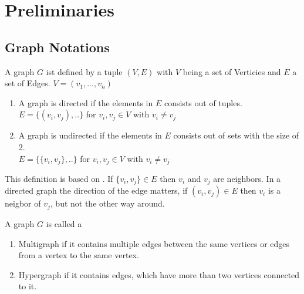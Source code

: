 \chapter{Preliminaries}
\label{Preliminaries}
\section{Graph Notations}
\begin{mydef}
A graph $G$ ist defined by a tuple $(V,E)$ with $V$ being a set of Verticies and $E$ a set of Edges.
$V = (v_{1}, ..., v_{n})$
\begin{enumerate}
 \item A graph is directed if the elements in $E$ consists out of tuples.\\
 $E = \{(v_{i},v_{j}),..\}$ for $v_{i},v_{j} \in V$ with $v_{i} \neq v_{j}$
 \item A graph is undirected if the elements in $E$ consists out of sets with the size of 2.\\
 $E = \{\{v_{i},v_{j}\},..\}$ for $v_{i},v_{j} \in V$ with $v_{i} \neq v_{j}$
\end{enumerate}
\end{mydef}
This definition is based on \cite{Diestel.2012}. If $\{v_{i},v_{j}\} \in E$ then $v_{i}$ and $v_{j}$ are neighbors. In a directed graph the direction of the edge matters, if $(v_{i},v_{j}) \in E$ then $v_{i}$ is a neigbor of $v_{j}$, but not the other way around.
\begin{mydef}
A graph $G$ is called a
\begin{enumerate}
 \item Multigraph if it contains multiple edges between the same vertices or edges from a vertex to the same vertex.
 \item Hypergraph if it contains edges, which have more than two vertices connected to it.
\end{enumerate}
\end{mydef}
\newpage
